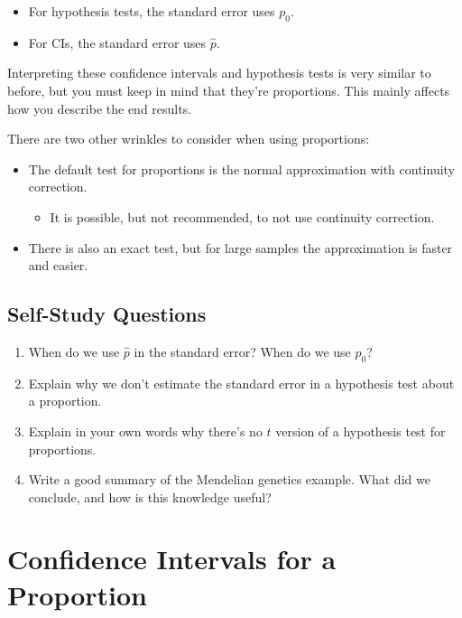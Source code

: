 \documentclass[
  letterpaper,
  DIV=11,
  numbers=noendperiod]{scrreprt}
\providecommand{\tightlist}{%
  \setlength{\itemsep}{0pt}\setlength{\parskip}{0pt}}\usepackage{longtable,booktabs,array}
\begin{document}
\begin{itemize}
\tightlist
\item
  For hypothesis tests, the standard error uses \(p_0\).
\item
  For CIs, the standard error uses \(\hat p\).
\end{itemize}

Interpreting these confidence intervals and hypothesis tests is very
similar to before, but you must keep in mind that they're proportions.
This mainly affects how you describe the end results.

There are two other wrinkles to consider when using proportions:

\begin{itemize}
\tightlist
\item
  The default test for proportions is the normal approximation with
  continuity correction.

  \begin{itemize}
  \tightlist
  \item
    It is possible, but not recommended, to not use continuity
    correction.
  \end{itemize}
\item
  There is also an exact test, but for large samples the approximation
  is faster and easier.
\end{itemize}

\hypertarget{self-study-questions-6}{%
\section{Self-Study Questions}\label{self-study-questions-6}}

\begin{enumerate}
\def\labelenumi{\arabic{enumi}.}
\tightlist
\item
  When do we use \(\hat p\) in the standard error? When do we use
  \(p_0\)?
\item
  Explain why we don't estimate the standard error in a hypothesis test
  about a proportion.
\item
  Explain in your own words why there's no \(t\) version of a hypothesis
  test for proportions.
\item
  Write a good summary of the Mendelian genetics example. What did we
  conclude, and how is this knowledge useful?
\end{enumerate}

\hypertarget{confidence-intervals-for-a-proportion}{%
\chapter{Confidence Intervals for a
Proportion}\label{confidence-intervals-for-a-proportion}}
\end{document}
